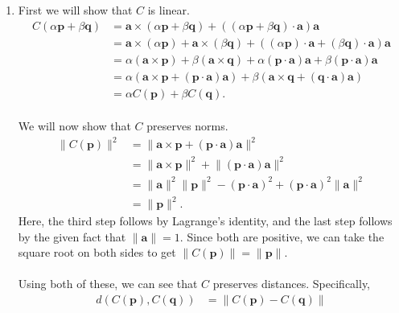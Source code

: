 \documentclass[12 pt, letterpaper]{hmcpset}
\begin{document}
\begin{solution}
	\begin{enumerate}
		\item First we will show that $C$ is linear.
			\[
				\begin{split}
					C(\alpha \mathbf{p} + \beta \mathbf{q}) & = \mathbf{a} \times (\alpha \mathbf{p} + \beta \mathbf{q}) + ((\alpha \mathbf{p} + \beta \mathbf{q}) \cdot \mathbf{a}) \mathbf{a} \\
								   & = \mathbf{a} \times (\alpha \mathbf{p}) + \mathbf{a} \times (\beta \mathbf{q}) + ((\alpha \mathbf{p}) \cdot \mathbf{a} +  (\beta \mathbf{q}) \cdot \mathbf{a}) \mathbf{a} \\
								   & = \alpha(\mathbf{a} \times \mathbf{p}) + \beta (\mathbf{a} \times \mathbf{q}) + \alpha(\mathbf{p} \cdot \mathbf{a}) \mathbf{a} + \beta (\mathbf{p} \cdot \mathbf{a}) \mathbf{a} \\
								   & = \alpha(\mathbf{a} \times \mathbf{p} + (\mathbf{p} \cdot \mathbf{a}) \mathbf{a}) + \beta (\mathbf{a} \times \mathbf{q} + (\mathbf{q} \cdot \mathbf{a}) \mathbf{a}) \\
								   & = \alpha C(\mathbf{p}) + \beta C(\mathbf{q}).
				\end{split}
			\] \\
			We will now show that $C$ preserves norms.
			\[
				\begin{split}
					\lVert C(\mathbf{p}) \rVert^{2} & = \lVert \mathbf{a} \times \mathbf{p} + (\mathbf{p} \cdot \mathbf{a}) \mathbf{a} \rVert^{2} \\
									& = \lVert \mathbf{a} \times \mathbf{p} \rVert^{2} + \lVert (\mathbf{p} \cdot \mathbf{a}) \mathbf{a} \rVert^{2} \\
									& = \lVert \mathbf{a} \rVert^{2} \lVert \mathbf{p} \rVert^{2} - (\mathbf{p} \cdot \mathbf{a})^{2} + (\mathbf{p} \cdot \mathbf{a})^{2} \lVert \mathbf{a} \rVert^{2} \\
									& = \lVert \mathbf{p} \rVert^{2}.
				\end{split}
			\]
			Here, the third step follows by Lagrange's identity, and the last step follows by the given fact that $\lVert \mathbf{a} \rVert = 1$. Since both are positive, we can take the square root on both sides to get $\lVert C(\mathbf{p}) \rVert = \lVert \mathbf{p} \rVert$. \\\\
			Using both of these, we can see that $C$ preserves distances. Specifically, 
			\[
				\begin{split}
					d(C(\mathbf{p}), C(\mathbf{q})) & = \lVert C(\mathbf{p}) - C(\mathbf{q}) \rVert \\

\end{split}\]
\end{enumerate}
\end{solution}
\end{document}
